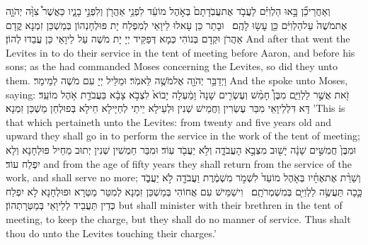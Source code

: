 {וְאַחֲרֵי\maqqaf כֵ֞ן בָּ֣אוּ הַלְוִיִּ֗ם לַעֲבֹ֤ד אֶת\maqqaf עֲבֹֽדָתָם֙ בְּאֹ֣הֶל מוֹעֵ֔ד לִפְנֵ֥י אַהֲרֹ֖ן וְלִפְנֵ֣י בָנָ֑יו כַּאֲשֶׁר֩ צִוָּ֨ה יְהֹוָ֤ה אֶת\maqqaf מֹשֶׁה֙ עַל\maqqaf הַלְוִיִּ֔ם כֵּ֖ן עָשׂ֥וּ לָהֶֽם׃ \setuma }
{וּבָתַר כֵּן עָאלוּ לֵיוָאֵי לְמִפְלַח יָת פּוּלְחָנְהוֹן בְּמַשְׁכַּן זִמְנָא קֳדָם אַהֲרֹן וּקְדָם בְּנוֹהִי כְּמָא דְּפַקֵּיד יְיָ יָת מֹשֶׁה עַל לֵיוָאֵי כֵּן עֲבַדוּ לְהוֹן׃}
{And after that went the Levites in to do their service in the tent of meeting before Aaron, and before his sons; as the \lord\space had commanded Moses concerning the Levites, so did they unto them.}{}
{וַיְדַבֵּ֥ר יְהֹוָ֖ה אֶל\maqqaf מֹשֶׁ֥ה לֵּאמֹֽר׃}
{וּמַלֵּיל יְיָ עִם מֹשֶׁה לְמֵימַר׃}
{And the \lord\space spoke unto Moses, saying:}{}
{זֹ֖את אֲשֶׁ֣ר לַלְוִיִּ֑ם מִבֶּן֩ חָמֵ֨שׁ וְעֶשְׂרִ֤ים שָׁנָה֙ וָמַ֔עְלָה יָבוֹא֙ לִצְבֹ֣א צָבָ֔א בַּעֲבֹדַ֖ת אֹ֥הֶל מוֹעֵֽד׃}
{דָּא דִּלְלֵיוָאֵי מִבַּר עֶשְׂרִין וַחֲמֵישׁ שְׁנִין וּלְעֵילָא יֵיתֵי לְחַיָּילָא חֵילָא בְּפוּלְחַן מַשְׁכַּן זִמְנָא׃}
{’This is that which pertaineth unto the Levites: from twenty and five years old and upward they shall go in to perform the service in the work of the tent of meeting;}{}
{וּמִבֶּן֙ חֲמִשִּׁ֣ים שָׁנָ֔ה יָשׁ֖וּב מִצְּבָ֣א הָעֲבֹדָ֑ה וְלֹ֥א יַעֲבֹ֖ד עֽוֹד׃}
{וּמִבַּר חַמְשִׁין שְׁנִין יְתוּב מֵחֵיל פּוּלְחָנָא וְלָא יִפְלַח עוֹד׃}
{and from the age of fifty years they shall return from the service of the work, and shall serve no more;}{}
{וְשֵׁרֵ֨ת אֶת\maqqaf אֶחָ֜יו בְּאֹ֤הֶל מוֹעֵד֙ לִשְׁמֹ֣ר מִשְׁמֶ֔רֶת וַעֲבֹדָ֖ה לֹ֣א יַעֲבֹ֑ד כָּ֛כָה תַּעֲשֶׂ֥ה לַלְוִיִּ֖ם בְּמִשְׁמְרֹתָֽם׃ \petucha }
{וִישַׁמֵּישׁ עִם אֲחוֹהִי בְּמַשְׁכַּן זִמְנָא לְמִטַּר מַטְּרָא וּפוּלְחָנָא לָא יִפְלַח כְּדֵין תַּעֲבֵיד לְלֵיוָאֵי בְּמַטְּרָתְהוֹן׃}
{but shall minister with their brethren in the tent of meeting, to keep the charge, but they shall do no manner of service. Thus shalt thou do unto the Levites touching their charges.’}{}
